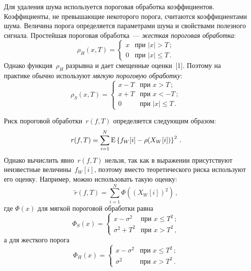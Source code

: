 \begin{multicols}{2}
Для удаления шума используется пороговая обработка коэффициентов. Коэффициенты, не 
превышающие некоторого порога, считаются коэффициентами шума. Величина порога определяется 
параметрами шума и свойствами полезного сигнала. Простейшая пороговая обработка~--- \textit{жесткая пороговая обработка}:
\begin{equation*}
\rho_H(x, T)=\begin{cases}
x & \text{при } |x|>T\,;\\
0 & \text{при } |x|\leq T\,.
\end{cases}
\end{equation*}
Однако функция~$\rho_H$ разрывна и дает смещенные оценки~[1]. 
Поэтому на практике обычно используют \textit{мягкую пороговую обработку}:
\begin{equation*}
\rho_S(x, T)=
\begin{cases}
x-T & \text{при } x>T\,;\\
x+T & \text{при } x<-T\,;\\
0 & \text{при } |x|\leq T\,.
\end{cases}
\end{equation*}

Риск пороговой обработки~$r(f,T)$ определяется следующим образом:
\begin{equation*}
r(f,T)=\sum_{i=1}^{N}\textrm{E}\left\{f_W[i]-\rho(X_W[i])\right\}^2\,.
\end{equation*}
Однако вычислить явно~$r(f,T)$ нельзя, так как в выражении присутствуют неизвестные величины~$f_W[i]$, 
поэтому вместо теоретического риска используют его оценку. Например, можно использовать такую оценку:
\begin{equation}
\label{eq_estimRiskDef}
\tilde{r}(f,T)=\sum_{i=1}^{N}\Phi\left((X_W[i])^2\right)\,,
\end{equation}
где $\Phi(x)$ для мягкой пороговой обработки равна
\begin{equation*}
\Phi_S(x)=
\begin{cases}
x-\sigma^2 & \text{при } x\leq T^2\,;\\
\sigma^2+T^2 & \text{при } x> T^2\,,
\end{cases}
\end{equation*}
а для жесткого порога
\begin{equation*}
\Phi_H(x)=
\begin{cases}
x-\sigma^2 & \text{при } x\leq T^2\,;\\
\sigma^2 & \text{при } x> T^2\,.
\end{cases}
\end{equation*}
\pagebreak


\end{multicols}
